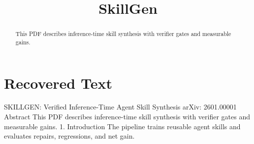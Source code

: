 \title{SkillGen}

\maketitle

\begin{abstract}
This PDF describes inference-time skill synthesis with verifier gates and measurable gains.
\end{abstract}

\section{Recovered Text}
SKILLGEN: Verified Inference-Time Agent Skill Synthesis
arXiv: 2601.00001
Abstract
This PDF describes inference-time skill synthesis with verifier gates and measurable gains.
1. Introduction
The pipeline trains reusable agent skills and evaluates repairs, regressions, and net gain.

